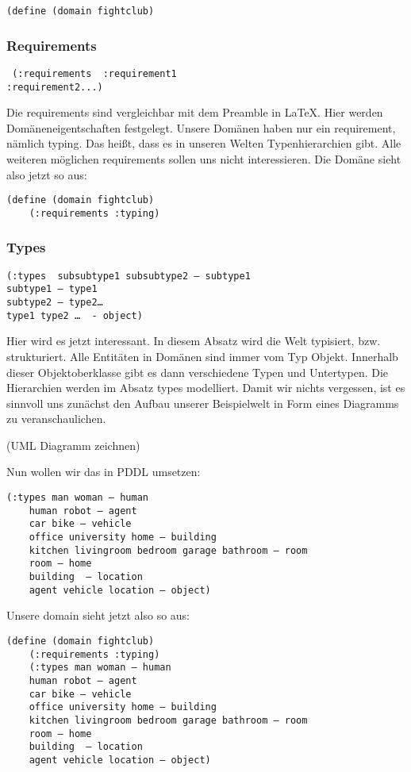 \documentclass[koma,DIV=1,BCOR=1mm]{article}
\begin{document}
\begin{verbatim}
(define (domain fightclub)
\end{verbatim}
\subsubsection{Requirements}
\label{sec-2-3-2}
\begin{verbatim}
 (:requirements  :requirement1
:requirement2...)
\end{verbatim}
Die requirements sind vergleichbar mit dem Preamble in \LaTeX{}. Hier
werden Domäneneigentschaften festgelegt. Unsere Domänen haben nur ein
requirement, nämlich typing. Das heißt, dass es in unseren Welten
Typenhierarchien gibt. Alle weiteren möglichen requirements sollen uns
nicht interessieren. Die Domäne sieht also jetzt so aus:
\begin{verbatim}
(define (domain fightclub)
	(:requirements :typing)
\end{verbatim}
\subsubsection{Types}
\label{sec-2-3-3}
\begin{verbatim}
(:types  subsubtype1 subsubtype2 – subtype1
subtype1 – type1
subtype2 – type2…
type1 type2 …  - object)
\end{verbatim}

Hier wird es jetzt interessant. In diesem Absatz wird die Welt
typisiert, bzw. strukturiert. Alle Entitäten in Domänen sind immer vom
Typ Objekt. Innerhalb dieser Objektoberklasse gibt es dann
verschiedene Typen und Untertypen. Die Hierarchien werden im Absatz
types modelliert. Damit wir nichts vergessen, ist es sinnvoll uns
zunächst den Aufbau unserer Beispielwelt in Form eines Diagramms zu
veranschaulichen.

(UML Diagramm zeichnen)

Nun wollen wir das in PDDL umsetzen:

\begin{verbatim}
(:types man woman – human
	human robot – agent 
	car bike – vehicle
	office university home – building
	kitchen livingroom bedroom garage bathroom – room
	room – home 
	building  – location 
	agent vehicle location – object)
\end{verbatim}

Unsere domain sieht jetzt also so aus:

\begin{verbatim}
(define (domain fightclub)
	(:requirements :typing)
	(:types man woman – human
	human robot – agent 
	car bike – vehicle
	office university home – building
	kitchen livingroom bedroom garage bathroom – room
	room – home 
	building  – location 
	agent vehicle location – object)
\end{verbatim}
\end{document}
